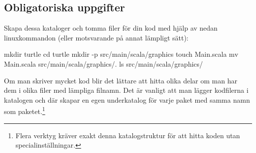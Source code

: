 %
%
%
%
%
%
%
%
%
%
%
%
%
%
%
%
%
%
%
%
%
%
%
%
%

\subsection{Obligatoriska uppgifter}


\Task Skapa dessa kataloger %
och tomma filer för din kod med hjälp av nedan linuxkommandon (eller motsvarande på annat lämpligt sätt):
\begin{REPLnonum}
mkdir turtle
cd turtle
mkdir -p src/main/scala/graphics
touch Main.scala
mv Main.scala src/main/scala/graphics/.
ls src/main/scala/graphics/
\end{REPLnonum}
Om man skriver mycket kod blir det lättare att hitta olika delar om man har dem i olika filer med lämpliga  filnamn. Det är vanligt att man lägger kodfilerna i katalogen  och där skapar en egen underkatalog för varje paket med samma namn som paketet.\footnote{Flera verktyg kräver exakt denna katalogstruktur för att hitta koden utan specialinställningar.}


